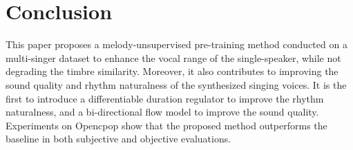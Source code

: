 \section{Conclusion}

This paper proposes a melody-unsupervised pre-training method conducted on a multi-singer dataset to enhance the vocal range of the single-speaker, while not degrading the timbre similarity.
Moreover, it also contributes to improving the sound quality and rhythm naturalness of the synthesized singing voices. It is the first to introduce a differentiable duration regulator to improve the rhythm naturalness, and a bi-directional flow model to improve the sound quality.
Experiments on Opencpop show that the proposed method outperforms the baseline in both subjective and objective evaluations.



